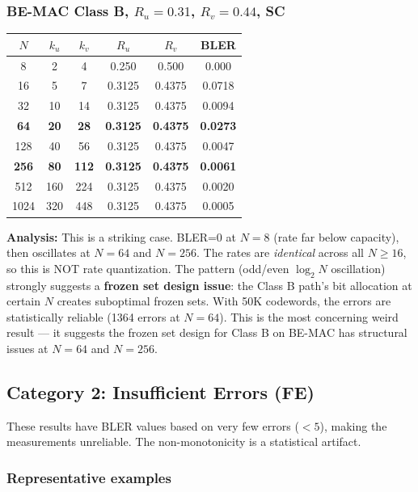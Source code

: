 \documentclass[11pt,a4paper]{article}
\newcommand{\up}[1]{\textcolor{upcolor}{\textbf{#1}}}
\newcommand{\good}[1]{\textcolor{goodcolor}{#1}}
\begin{document}
\subsubsection{BE-MAC Class B, $R_u=0.31$, $R_v=0.44$, SC}

\begin{tabular}{cccccc}
\toprule
$N$ & $k_u$ & $k_v$ & $R_u$ & $R_v$ & BLER \\
\midrule
8 & 2 & 4 & 0.250 & 0.500 & \good{0.000} \\
16 & 5 & 7 & 0.3125 & 0.4375 & 0.0718 \\
32 & 10 & 14 & 0.3125 & 0.4375 & 0.0094 \\
\textbf{64} & \textbf{20} & \textbf{28} & \textbf{0.3125} & \textbf{0.4375} & \up{0.0273} \\
128 & 40 & 56 & 0.3125 & 0.4375 & 0.0047 \\
\textbf{256} & \textbf{80} & \textbf{112} & \textbf{0.3125} & \textbf{0.4375} & \up{0.0061} \\
512 & 160 & 224 & 0.3125 & 0.4375 & 0.0020 \\
1024 & 320 & 448 & 0.3125 & 0.4375 & 0.0005 \\
\bottomrule
\end{tabular}

\textbf{Analysis:} This is a striking case. BLER=0 at $N=8$ (rate far below capacity), then oscillates at $N=64$ and $N=256$. The rates are \emph{identical} across all $N\ge16$, so this is NOT rate quantization. The pattern (odd/even $\log_2 N$ oscillation) strongly suggests a \textbf{frozen set design issue}: the Class B path's bit allocation at certain $N$ creates suboptimal frozen sets. With 50K codewords, the errors are statistically reliable (1364 errors at $N=64$). This is the most concerning weird result — it suggests the frozen set design for Class B on BE-MAC has structural issues at $N=64$ and $N=256$.

\subsection{Category 2: Insufficient Errors (FE)}

These results have BLER values based on very few errors ($<5$), making the measurements unreliable. The non-monotonicity is a statistical artifact.

\subsubsection{Representative examples}
\end{document}
